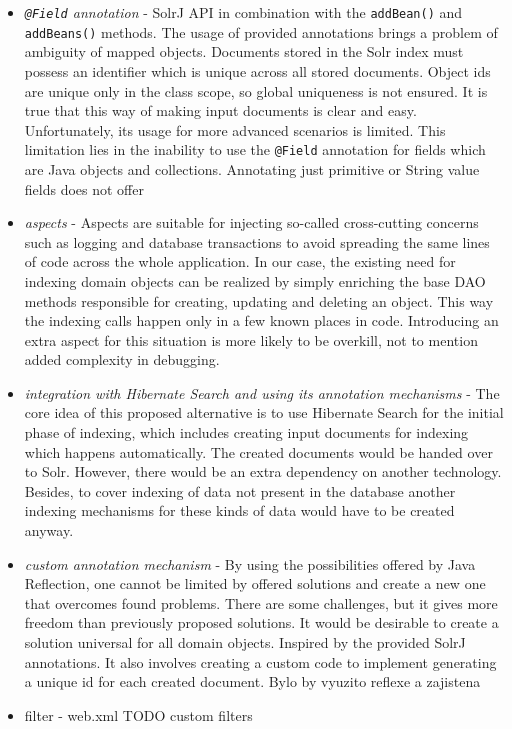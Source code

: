 \documentclass[12pt, oneside, a4paper]{book}
\begin{document}
\begin{itemize}
\item \textit{ \texttt{@Field} annotation} 
- SolrJ API in combination with the \texttt{addBean()} and \texttt{addBeans()} methods.
The usage of provided annotations brings a problem of ambiguity of mapped objects. 
Documents stored in the Solr index must possess an identifier which is unique across all stored documents. 
Object ids are unique only in the class scope, so global uniqueness is not ensured. 
It is true that this way of making input documents is clear and easy. 
Unfortunately, its usage for more advanced scenarios is limited. 
This limitation lies in the inability to use the \texttt{@Field} annotation for fields which are Java objects and collections. 
Annotating just primitive or String value fields does not offer 

\item \textit{aspects} 
- Aspects are suitable for injecting so-called cross-cutting concerns such as logging and database transactions to avoid spreading the same lines of code across the whole application. 
In our case, the existing need for indexing domain objects can be realized by simply enriching the base DAO methods responsible for creating, updating and deleting an object. 
This way the indexing calls happen only in a few known places in code. 
Introducing an extra aspect for this situation is more likely to be overkill, not to mention added complexity in debugging.

\item \textit{integration with Hibernate Search and using its annotation mechanisms}
 - The core idea of this proposed alternative is to use Hibernate Search for the initial phase of indexing, which includes creating input documents for indexing which happens automatically. 
The created documents would be handed over to Solr.
However, there would be an extra dependency on another technology. 
Besides, to cover indexing of data not present in the database another indexing mechanisms for these kinds of data would have to be created anyway. 

\item \textit{custom annotation mechanism}
- By using the possibilities offered by Java Reflection, one cannot be limited by offered solutions and create a new one that overcomes found problems. 
There are some challenges, but it gives more freedom than previously proposed solutions. 
It would be desirable to create a solution universal for all domain objects. 
Inspired by the provided SolrJ annotations. 
It also involves creating a custom code to implement generating a unique id for each created document.  
Bylo by vyuzito reflexe a zajistena

\item filter - web.xml TODO custom filters
\end{itemize}
\end{document}

